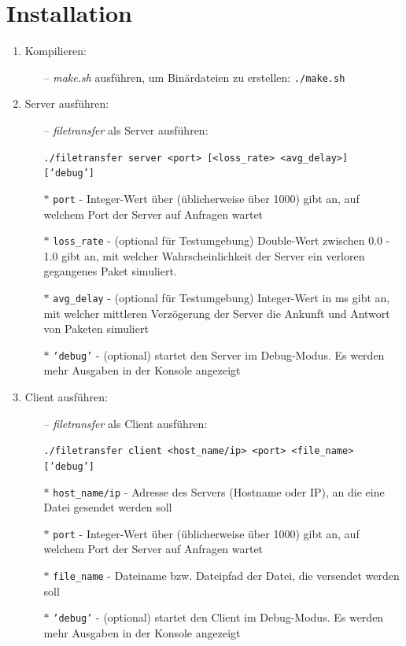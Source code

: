 \documentclass{article}
\begin{document}
	\section{Installation}
	\begin{enumerate}
		\item Kompilieren:

		\begin{enumerate}
			\item[--] \textit{make.sh} ausführen, um Binärdateien zu erstellen: \texttt{./make.sh}
		\end{enumerate}

		\item Server ausführen:

		\begin{enumerate}
			\item[--] \textit{filetransfer} als Server ausführen:

			\texttt{./filetransfer server <port> [<loss\_rate> <avg\_delay>] ['debug']}

			\item[$\ast$] \texttt{port} - Integer-Wert über (üblicherweise über 1000) gibt an, auf welchem Port der Server auf Anfragen wartet
			\item[$\ast$] \texttt{loss\_rate} - (optional für Testumgebung) Double-Wert zwischen 0.0 - 1.0 gibt an, mit welcher Wahrscheinlichkeit der Server ein verloren gegangenes Paket simuliert.
			\item[$\ast$] \texttt{avg\_delay} - (optional für Testumgebung) Integer-Wert in ms gibt an, mit welcher mittleren Verzögerung der Server die Ankunft und Antwort von Paketen simuliert
			\item[$\ast$] \texttt{'debug'} - (optional) startet den Server im Debug-Modus. Es werden mehr Ausgaben in der Konsole angezeigt

		\end{enumerate}

		\item Client ausführen:

		\begin{enumerate}
			\item[--] \textit{filetransfer} als Client ausführen:

			\texttt{./filetransfer client <host\_name/ip> <port> <file\_name> ['debug']}

			\item[$\ast$] \texttt{host\_name/ip} - Adresse des Servers (Hostname oder IP), an die eine Datei gesendet werden soll
			\item[$\ast$] \texttt{port} - Integer-Wert über (üblicherweise über 1000) gibt an, auf welchem Port der Server auf Anfragen wartet
			\item[$\ast$] \texttt{file\_name} - Dateiname bzw. Dateipfad der Datei, die versendet werden soll
			\item[$\ast$] \texttt{'debug'} - (optional) startet den Client im Debug-Modus. Es werden mehr Ausgaben in der Konsole angezeigt

		\end{enumerate}
	\end{enumerate}
\end{document}
